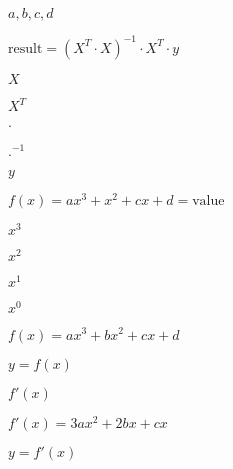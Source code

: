 \documentclass{article}
\begin{document}
$a,b,c,d$
\pagebreak

$\text{result} = (X^T \cdot X)^{-1} \cdot X^T \cdot y$
\pagebreak

$X$
\pagebreak

$X^T$
\pagebreak

$\cdot$
\pagebreak

$.^{-1}$
\pagebreak

$y$
\pagebreak

$f(x)=ax^3+x^2+cx+d=\text{value}$
\pagebreak

$x^3$
\pagebreak

$x^2$
\pagebreak

$x^1$
\pagebreak

$x^0$
\pagebreak

$f(x)=ax^3 + bx^2 + cx + d$
\pagebreak

$y=f(x)$
\pagebreak

$f'(x)$
\pagebreak

$f'(x)=3ax^2 + 2bx + cx$
\pagebreak

$y=f'(x)$
\pagebreak
\end{document}
